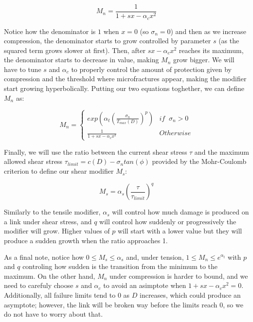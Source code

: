 \begin{equation}
    M_n = \frac{1}{1 + sx - \alpha_c x^2}
\end{equation}

Notice how the denominator is $1$ when $x = 0$ (so $\sigma_n = 0$) and then 
as we increase compression, the denominator starts to grow controlled by 
parameter $s$ (as the squared term grows slower at first). Then, after 
$sx - \alpha_cx^2 $ reaches its maximum, the denominator starts to decrease 
in value, making $M_n$ grow bigger. We will have to tune $s$ and $\alpha_c$ 
to properly control the amount of protection given by compression and the 
threshold where microfractures appear, making the modifier start growing 
hyperbolically. Putting our two equations toghether, we can define $M_n$ 
as:

\begin{equation}
    M_n = \begin{cases}
        exp(\alpha_t(\frac{\sigma_n}{T_{max}(D)})^p) & if \; \; \sigma_n > 0\\
        \frac{1}{1 + sx - \alpha_c x^2} & Otherwise
    \end{cases}
\end{equation}

Finally, we will use the ratio between the current shear stress $\tau$ 
and the maximum allowed shear stress $\tau_{limit} = c(D) - \sigma_n tan(\phi)$ provided by the 
Mohr-Coulomb criterion to define our shear modifier $M_s$: 

\begin{equation}
    M_s = \alpha_s (\frac{\tau}{\tau_{limit}})^q
\end{equation}

Similarly to the tensile modifier, $\alpha_s$ will control 
how much damage is produced on a link under shear stress, and $q$ will 
control how suddenly or progressively the modifier will grow. Higher 
values of $p$ will start with a lower value but they will produce 
a sudden growth when the ratio approaches 1. 

\vspace{10pt}

As a final note, notice how $0 \leq M_s \leq \alpha_s$ and, under tension, 
$1 \leq M_n \leq e^{\alpha_t}$ with $p$ and $q$ controling how sudden is 
the transition from the minimum to the maximum. On the other hand, $M_n$
under compression is harder to bound, and we need to carefuly choose 
$s$ and $\alpha_c$ to avoid an asimptote when $1 + sx - \alpha_cx^2 = 0$.
Additionally, all failure limits tend to $0$ as $D$ increases, which 
could produce an asymptote; however, the link will be broken way before
the limits reach $0$, so we do not have to worry about that.
